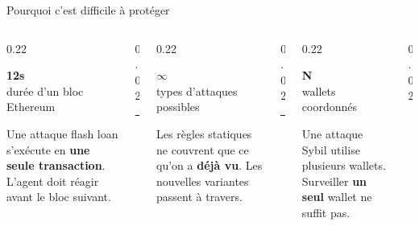 \documentclass[aspectratio=169,12pt]{beamer}
\begin{document}
\begin{frame}{Pourquoi c'est difficile à protéger}
  \vspace{0.3cm}
  \begin{columns}[T]
    \begin{column}{0.22\textwidth}
      \begin{center}
        {\color{primary}\fontsize{30}{32}\selectfont\bfseries 12s}\\
        {\tiny\color{midgray} durée d'un bloc\\Ethereum}
      \end{center}
      \vspace{0.3cm}
      {\small Une attaque flash loan s'exécute en \textbf{une seule transaction}. L'agent doit réagir avant le bloc suivant.}
    \end{column}
    \begin{column}{0.02\textwidth}
      {\color{lightgray}\rule{0.5pt}{4cm}}
    \end{column}
    \begin{column}{0.22\textwidth}
      \begin{center}
        {\color{accent}\fontsize{30}{32}\selectfont\bfseries $\infty$}\\
        {\tiny\color{midgray} types d'attaques\\possibles}
      \end{center}
      \vspace{0.3cm}
      {\small Les règles statiques ne couvrent que ce qu'on a \textbf{déjà vu}. Les nouvelles variantes passent à travers.}
    \end{column}
    \begin{column}{0.02\textwidth}
      {\color{lightgray}\rule{0.5pt}{4cm}}
    \end{column}
    \begin{column}{0.22\textwidth}
      \begin{center}
        {\color{primary}\fontsize{30}{32}\selectfont\bfseries N}\\
        {\tiny\color{midgray} wallets\\coordonnés}
      \end{center}
      \vspace{0.3cm}
      {\small Une attaque Sybil utilise plusieurs wallets. Surveiller \textbf{un seul} wallet ne suffit pas.}
    \end{column}
    \begin{column}{0.02\textwidth}

\end{column}
\end{columns}
\end{frame}
\end{document}
